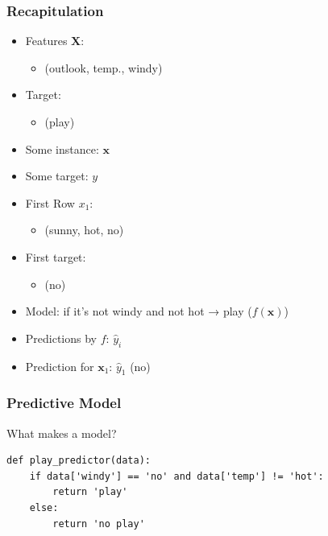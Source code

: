 \documentclass{beamer}
\begin{document}
\begin{frame}[t]
  \frametitle{Recapitulation}
\begin{itemize}
  \item Features $\mathbf{X}$: 
  \begin{itemize}
    \item (outlook, temp., windy)
  \end{itemize}
  \item Target: 
  \begin{itemize}
    \item (play)
  \end{itemize}
  \item Some instance: $\mathbf{x}$
  \item Some target: $y$
  \item First Row $x_1$:
  \begin{itemize}
    \item (sunny, hot, no)
  \end{itemize}
  \item First target: 
  \begin{itemize}
    \item (no)
  \end{itemize}
\item \alert{Model}: if it's not windy and not hot → play ($f(\mathbf{x})$)
  \item \alert{Predictions by} $f$: $\hat{y}_i$
  \item \alert{Prediction for} $\mathbf{x}_1$: $\hat{y}_1$ (no)
\end{itemize}
\end{frame}

\begin{frame}[fragile]
  \frametitle{Predictive Model}

  \begin{tcolorbox}[myblock={Model}]
    What makes a model?
  \end{tcolorbox}

  \begin{verbatim}
def play_predictor(data):
    if data['windy'] == 'no' and data['temp'] != 'hot':
        return 'play'
    else:
        return 'no play'
  \end{verbatim}

\end{frame}
\end{document}
